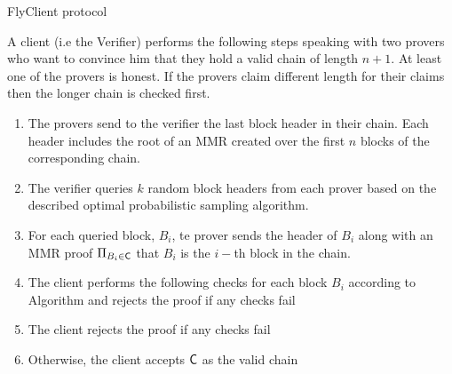 	\begin{algorithm}[h]
		\caption{\label{alg:flyclient_suffix_protocol}FlyClient protocol~\cite{flyclient}}
		A client (i.e the Verifier) performs the following steps speaking with two provers who want to convince him that they hold a valid chain of length $n+1$. At least one of the provers is honest. If the provers claim different length for their claims then the longer chain is checked first.
		\begin{enumerate}
			\item The provers send to the verifier the last block header in their chain. Each header includes the root of an MMR created over the first $n$ blocks of the corresponding chain. 
			\item The verifier queries $k$ random block headers from each prover based on the described optimal probabilistic sampling algorithm.
			\item For each queried block, $B_i$, te prover sends the header of $B_i$ along with an MMR proof $\Pi_{B_i \in \mathsf{C}}$ that $B_i$ is the $i-$th block in the chain.
			\item The client performs the following checks for each block $B_i$ according to Algorithm  and rejects the proof if any checks fail
			\item The client rejects the proof if any checks fail
			\item Otherwise, the client accepts $\mathsf{C}$ as the valid chain
		\end{enumerate}
	\end{algorithm}

